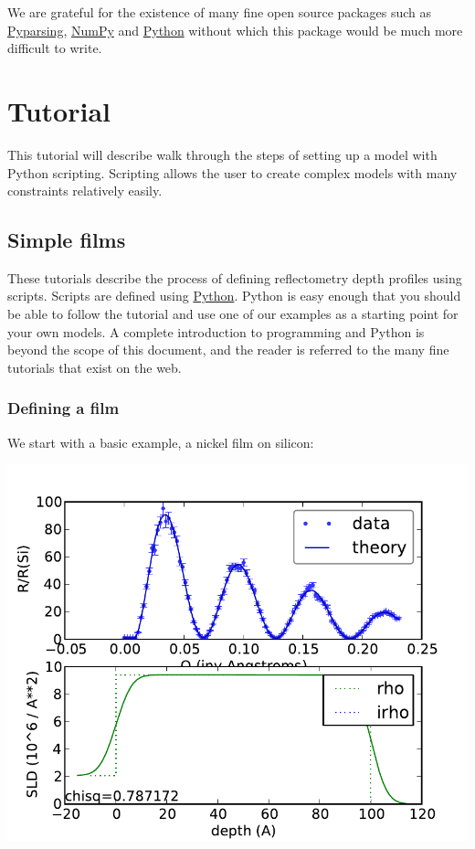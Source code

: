 \documentclass[letterpaper,10pt,english]{sphinxmanual}
\begin{document}
We are grateful for the existence of many fine open source packages such
as \href{http://pyparsing.wikispaces.com/}{Pyparsing},
\href{http://numpy.scipy.org/}{NumPy} and \href{http://www.python.org/}{Python}
without which this package would be much more difficult to write.


\chapter{Tutorial}
\label{examples/index::doc}\label{examples/index:tutorial}\label{examples/index:tutorial-index}
This tutorial will describe walk through the steps of setting up a
model with Python scripting.  Scripting allows the user to create
complex models with many constraints relatively easily.


\section{Simple films}
\label{examples/ex1/readme:simple-films}\label{examples/ex1/readme::doc}
These tutorials describe the process of defining reflectometry depth
profiles using scripts.  Scripts are defined using
\href{http://www.python.org}{Python}.  Python is easy enough that you should
be able to follow the tutorial and use one of our examples as a starting
point for your own models.  A complete introduction to programming
and Python is beyond the scope of this document, and the reader is referred
to the many fine tutorials that exist on the web.


\subsection{Defining a film}
\label{examples/ex1/nifilm:defining-a-film}\label{examples/ex1/nifilm::doc}
We start with a basic example, a nickel film on silicon:

\includegraphics{a2ca71e2ff.pdf}
\end{document}
